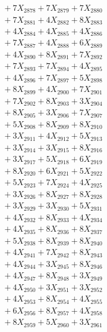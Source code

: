 \documentclass[a4paper,10pt]{article}
\begin{document}
{\begin{align}
&\;  + 7 X_{2878} + 7 X_{2879} + 7 X_{2880} \\[0.3ex]
&\;  + 7 X_{2881} + 4 X_{2882} + 8 X_{2883} \\[0.3ex]
&\;  + 4 X_{2884} + 4 X_{2885} + 4 X_{2886} \\[0.3ex]
&\;  + 7 X_{2887} + 4 X_{2888} + 6 X_{2889} \\[0.5ex]\allowbreak
&\;  + 4 X_{2890} + 8 X_{2891} + 7 X_{2892} \\[0.3ex]
&\;  + 7 X_{2893} + 7 X_{2894} + 4 X_{2895} \\[0.3ex]
&\;  + 4 X_{2896} + 7 X_{2897} + 5 X_{2898} \\[0.3ex]
&\;  + 8 X_{2899} + 4 X_{2900} + 7 X_{2901} \\[0.3ex]
&\;  + 7 X_{2902} + 8 X_{2903} + 3 X_{2904} \\[0.3ex]
&\;  + 8 X_{2905} + 3 X_{2906} + 7 X_{2907} \\[0.3ex]
&\;  + 5 X_{2908} + 8 X_{2909} + 8 X_{2910} \\[0.3ex]
&\;  + 3 X_{2911} + 4 X_{2912} + 5 X_{2913} \\[0.3ex]
&\;  + 3 X_{2914} + 3 X_{2915} + 8 X_{2916} \\[0.3ex]
&\;  + 3 X_{2917} + 5 X_{2918} + 6 X_{2919} \\[0.5ex]\allowbreak
&\;  + 8 X_{2920} + 6 X_{2921} + 5 X_{2922} \\[0.3ex]
&\;  + 5 X_{2923} + 7 X_{2924} + 4 X_{2925} \\[0.3ex]
&\;  + 3 X_{2926} + 8 X_{2927} + 8 X_{2928} \\[0.3ex]
&\;  + 3 X_{2929} + 3 X_{2930} + 5 X_{2931} \\[0.3ex]
&\;  + 4 X_{2932} + 8 X_{2933} + 4 X_{2934} \\[0.3ex]
&\;  + 4 X_{2935} + 8 X_{2936} + 8 X_{2937} \\[0.3ex]
&\;  + 5 X_{2938} + 8 X_{2939} + 8 X_{2940} \\[0.3ex]
&\;  + 4 X_{2941} + 7 X_{2942} + 8 X_{2943} \\[0.3ex]
&\;  + 4 X_{2944} + 3 X_{2945} + 8 X_{2946} \\[0.3ex]
&\;  + 4 X_{2947} + 8 X_{2948} + 3 X_{2949} \\[0.5ex]\allowbreak
&\;  + 4 X_{2950} + 3 X_{2951} + 3 X_{2952} \\[0.3ex]
&\;  + 4 X_{2953} + 8 X_{2954} + 4 X_{2955} \\[0.3ex]
&\;  + 6 X_{2956} + 8 X_{2957} + 4 X_{2958} \\[0.3ex]
&\;  + 8 X_{2959} + 5 X_{2960} + 3 X_{2961} \\[0.3ex]

\end{align}}
\end{document}
